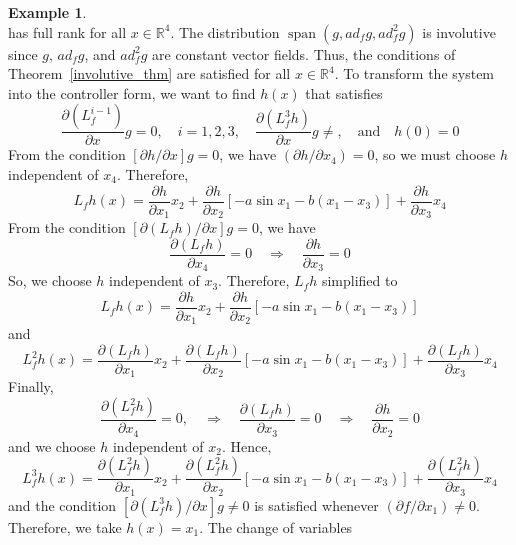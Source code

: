 \documentclass[11pt,a4paper,oneside]{book}
\numberwithin{equation}{section}
\DeclareMathOperator{\spn}{span}
\theoremstyle{it}
\theoremstyle{definition}
\newtheorem{example}{Example}[section]
\begin{document}
\begin{example}
\begin{equation*}
	\end{equation*}
	has full rank for all $x\in\mathbb{R}^4$. The distribution $\spn(g,ad_fg,ad^2_fg)$ is involutive since $g$, $ad_fg$, and $ad_f^2g$ are constant vector fields. Thus, the conditions of Theorem~\ref{involutive_thm} are satisfied for all $x\in\mathbb{R}^4$. To transform the system into the controller form, we want to find $h(x)$ that satisfies
	\begin{equation*}
		\frac{\partial(L_f^{i-1})}{\partial x}g=0, \quad i=1,2,3,\quad \frac{\partial(L_f^3h)}{\partial x} g\ne, \quad\text{and}\quad h(0)=0
	\end{equation*}
From the condition $[\partial h/\partial x]g=0$, we have $(\partial h/\partial x_4)=0$, so we must choose $h$ independent of $x_4$. Therefore,
\begin{equation*}
	L_fh(x) = \frac{\partial h}{\partial x_1}x_2+\frac{\partial h}{\partial x_2}[-a\sin x_1-b(x_1-x_3)]+\frac{\partial h}{\partial x_3}x_4
\end{equation*}
From the condition $[\partial (L_fh)/\partial x]g=0$, we have
\begin{equation*}
	\frac{\partial(L_fh)}{\partial x_4}=0\quad\Rightarrow\quad\frac{\partial h}{\partial x_3}=0
\end{equation*}
So, we choose $h$ independent of $x_3$. Therefore, $L_fh$ simplified to 
\begin{equation*}
	L_fh(x)=\frac{\partial h}{\partial x_1}x_2+\frac{\partial h}{\partial x_2}[-a\sin x_1-b(x_1-x_3)]
\end{equation*}
and 
\begin{equation*}
	L_f^2h(x)=\frac{\partial(L_fh)}{\partial x_1}x_2+\frac{\partial(L_fh)}{\partial x_2}[-a\sin x_1 - b(x_1-x_3)]+\frac{\partial(L_fh)}{\partial x_3}x_4
\end{equation*}
Finally,
\begin{equation*}
	\frac{\partial(L_f^2h)}{\partial x_4}=0,\quad\Rightarrow\quad\frac{\partial(L_fh)}{\partial x_3}=0\quad\Rightarrow\quad\frac{\partial h}{\partial x_2}=0
\end{equation*}
and we choose $h$ independent of $x_2$. Hence,
\begin{equation*}
	L_f^3h(x)=\frac{\partial(L_f^2h)}{\partial x_1}x_2+\frac{\partial(L_f^2h)}{\partial x_2}[-a\sin x_1-b(x_1-x_3)]+\frac{\partial(L_f^2h)}{\partial x_3}x_4
\end{equation*}
and the condition $[\partial(L_f^3h)/\partial x]g\ne0$ is satisfied whenever $(\partial f/\partial x_1)\ne0$. Therefore, we take $h(x)=x_1$. The change of variables

\end{example}
\end{document}
